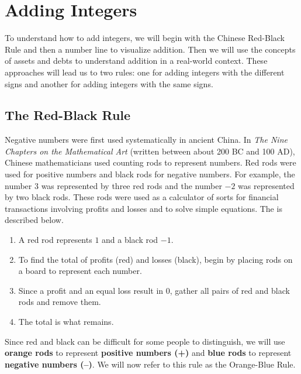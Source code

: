 \documentclass{ximera}[font=12pt]
\begin{document}
\section*{Adding Integers}

To understand how to add integers, we will begin with the Chinese Red-Black Rule and then a number line to visualize addition.  Then we will 
use the concepts of assets and debts to understand addition in a real-world context.  These approaches will lead us to two rules: one for adding 
integers with the different signs and another for adding integers with the same signs.

\subsection*{The Red-Black Rule}

Negative numbers were first used systematically in ancient China. In \emph{The Nine Chapters on the Mathematical Art} (written between about 200 BC and 100 AD), Chinese mathematicians used counting rods to represent numbers.  Red rods were used for positive numbers and black rods for negative numbers.  For example, the number 3 was
represented by three red rods and the number $-2$ was represented by two black rods.  These rods were used as a calculator of sorts for financial 
transactions involving profits and losses and to solve simple equations.  The  is described below.

\begin{enumerate}%
\item A red rod represents $1$ and a black rod $-1.$  

\item To find the total of profits (red) and losses (black), begin by placing rods on a board to represent each number.

\item Since a profit and an equal loss result in 0, gather all pairs of red and black rods and remove them.

\item The total is what remains.
\end{enumerate}


Since red and black can be difficult for some people to distinguish, we will use \textcolor{accessibleOrange}{\textbf{orange rods}} to 
represent \textcolor{accessibleOrange}{\textbf{positive numbers (+)}} and \textcolor{accessibleGlaucous}{\textbf{blue rods}} to represent 
\textcolor{accessibleGlaucous}{\textbf{negative numbers (--)}}.
We will now refer to this rule as the Orange-Blue Rule.
\end{document}
